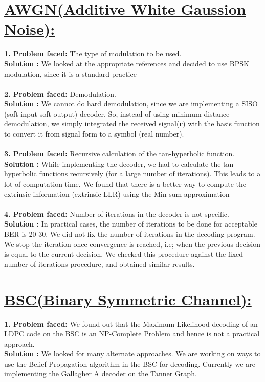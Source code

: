 \documentclass[12pt]{extarticle}
\newcommand{\<}{\langle}
\renewcommand{\>}{\rangle}
\theoremstyle{definition}
\begin{document}
\section{\underline{AWGN(Additive White Gaussion Noise):}}
\textbf{1. Problem faced:}  The type of modulation to be used.\\
\textbf{Solution :} We looked at the appropriate references and decided to use BPSK modulation, since it is a standard practice\\
\\
\textbf{2. Problem faced:}  Demodulation.\\
\textbf{Solution :}  We cannot do hard demodulation, since we are implementing a SISO (soft-input soft-output) decoder. So, instead of using minimum distance demodulation, we simply integrated the received signal(\textbf{r}) with the basis function to convert it from signal form to a symbol (real number).
\\
\\
\textbf{3. Problem faced:}  Recursive calculation of the tan-hyperbolic function.
\\
\textbf{Solution :} While implementing the decoder, we had to calculate the tan-hyperbolic functions recursively (for a large number of iterations). This leads to a lot of computation time. We found that there is a better way to compute the extrinsic information (extrinsic LLR) using the Min-sum approximation
\\
\\\textbf{4. Problem faced:}  Number of iterations in the decoder is not specific.\\
\textbf{Solution :} In practical cases, the number of iterations to be done for acceptable BER is 20-30. We did not fix the number of iterations in the decoding program. We stop the iteration once convergence is reached, i.e; when the previous decision is equal to the current decision. We checked this procedure against the fixed number of iterations procedure, and obtained similar results.
\\
\section{\underline{BSC(Binary Symmetric Channel):}}
\textbf{1. Problem faced:} We found out that the Maximum Likelihood decoding of an LDPC code on the BSC is an NP-Complete Problem and hence is not a practical approach.\\
\textbf{Solution :} We looked for many alternate approaches. We are working on ways to use the Belief Propagation algorithm in the BSC for decoding. Currently we are implementing the Gallagher A decoder on the Tanner Graph.
\end{document}

